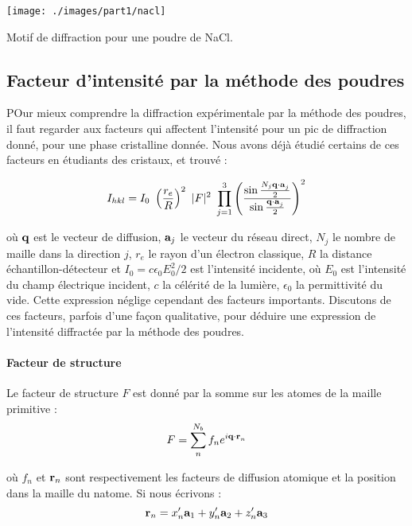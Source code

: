 \begin{marginfigure}
    \texttt{[image: ./images/part1/nacl]}
    \caption{Motif de diffraction pour une poudre de NaCl.}
    \label{fig:poudrepic}
\end{marginfigure}


\subsection{Facteur d'intensité par la méthode des poudres}

POur mieux comprendre la diffraction expérimentale par la méthode des poudres, il faut regarder aux facteurs qui affectent l'intensité pour un pic de diffraction donné, pour une phase cristalline donnée. Nous avons déjà étudié certains de ces facteurs en étudiants des cristaux, et trouvé :

\begin{equation}
    I_{hkl} = I_0 \ 
        \left( \frac{r_e}{R} \right)^2 \ 
        |F|^2 \ 
        \prod_{j=1}^3 \left(
            \frac{ \sin \frac{N_j \v{q \cdot a}_j}{2} }{ \sin \frac{\v{q\cdot a}_j}{2} } \right)^2
    \label{eq:facteurintensite}
\end{equation}

où $\mathbf{q}$ est le vecteur de diffusion, $\mathbf{a}_j$ le vecteur du réseau direct, $N_j$ le nombre de maille dans la direction $j$, $r_e$ le rayon d'un électron classique, $R$ la distance échantillon-détecteur et $I_0 = c\epsilon_0 E_0^2/2$ est l'intensité incidente, où $E_0$ est l'intensité du champ électrique incident, $c$ la célérité de la lumière, $\epsilon_0$ la permittivité du vide. Cette expression néglige cependant des facteurs importants. Discutons de ces facteurs, parfois d'une façon qualitative, pour déduire une expression de l'intensité diffractée par la méthode des poudres.

\paragraph{Facteur de structure}

Le facteur de structure $F$ est donné par la somme sur les atomes de la maille primitive :
\begin{equation}
    F = \sum_n^{N_b} f_n e^{i\mathbf{q\cdot r}_n}
\end{equation}

où $f_n$ et $\mathbf{r}_n$ sont respectivement les facteurs de diffusion atomique et la position dans la maille du n\ieme atome. Si nous écrivons :
\begin{equation}
    \mathbf{r}_n = x'_n \mathbf{a}_1 + y'_n \mathbf{a}_2 + z'_n \mathbf{a}_3
\end{equation}

